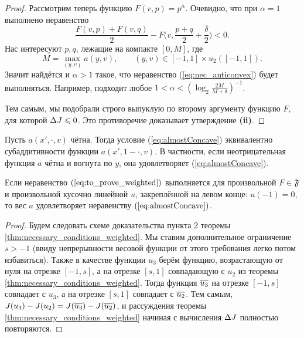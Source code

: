 \begin{proof}
Рассмотрим теперь функцию $F(v, p) = p^\alpha$.
Очевидно, что при $\alpha = 1$ выполнено неравенство
\begin{equation}
\label{eq:nec_anticonvex}
\frac{F(v, p) + F(v, q)}{ 2 } - F \bigl( v, \frac{p + q}{ 2 } + \frac{\delta}{ 2 } \bigr) < 0.
\end{equation}
Нас интересуют $p, q$, лежащие на компакте $[0, M]$, где
\begin{equation*}
M = \max \limits_{(y, v)} a(y, v), \qquad (y, v) \in [-1, 1 ] \times u_2([-1, 1] ).
\end{equation*}
Значит найдётся и $\alpha > 1$ такое, что неравенство (\ref{eq:nec_anticonvex}) будет выполняться.
Например, подходит любое $1 < \alpha < ( \log_2 \frac{2 M}{M + \delta} )^{-1}$.

Тем самым, мы подобрали строго выпуклую по второму аргументу функцию $F$, для которой $\Delta J \leqslant 0$.
Это противоречие доказывает утверждение \textbf{(ii)}.
\end{proof}

\begin{rem}
Пусть $a(x', \cdot, v)$ чётна.
Тогда условие (\ref{eq:almostConcave}) эквивалентно субаддитивности функции $a(x', 1 - \cdot, v)$.
В частности, если неотрицательная функция $a$ чётна и вогнута по $y$, она удовлетворяет (\ref{eq:almostConcave}).
\end{rem}

\begin{thm}
Если неравенство $(\ref{eq:to_prove_weighted})$ выполняется для произвольной $F \in \mathfrak{F}$
и произвольной кусочно линейной $u$, закреплённой на левом конце: $u( -1 ) = 0$,
то вес $a$ удовлетворяет неравенству $(\ref{eq:almostConcave})$.
\end{thm}

\begin{proof}
Будем следовать схеме доказательства пункта 2 теоремы \ref{thm:necessary_conditions_weighted}.
Мы ставим дополнительное ограничение $s > -1$
(ввиду непрерывности весовой функции от этого требования легко потом избавиться).
Также в качестве функции $u_3$ берём функцию, возрастающую от нуля на отрезке $[-1, s]$,
а на отрезке $[s, 1]$ совпадающую с $u_2$ из теоремы \ref{thm:necessary_conditions_weighted}.
Тогда функция $\mon{u_3}$ на отрезке $[-1, s]$ совпадает с $u_3$, а на отрезке $[s, 1]$ совпадает с $\mon{u_2}$.
Тем самым, $\IWg(u_3) - \IWg(u_2) = \IWg(\mon{u_3}) - \IWg(\mon{u_2})$,
и рассуждения теоремы \ref{thm:necessary_conditions_weighted} начиная с вычисления $\Delta J$ полностью повторяются.
\end{proof}
